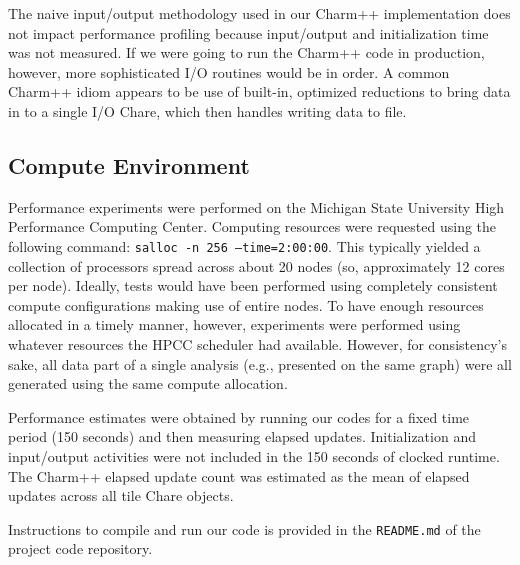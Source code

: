 The naive input/output methodology used in our Charm++ implementation does not impact performance profiling because input/output and initialization time was not measured.
If we were going to run the Charm++ code in production, however, more sophisticated I/O routines would be in order.
A common Charm++ idiom appears to be use of built-in, optimized reductions to bring data in to a single I/O Chare, which then handles writing data to file.

\subsection{Compute Environment} \label{sec:compute}

Performance experiments were performed on the Michigan State University High Performance Computing Center.
Computing resources were requested using the following command: \texttt{salloc -n 256 --time=2:00:00}.
This typically yielded a collection of processors spread across about 20 nodes (so, approximately 12 cores per node).
Ideally, tests would have been performed using completely consistent compute configurations making use of entire nodes.
To have enough resources allocated in a timely manner, however, experiments were performed using whatever resources the HPCC scheduler had available.
However, for consistency's sake, all data part of a single analysis (e.g., presented on the same graph) were all generated using the same compute allocation.

Performance estimates were obtained by running our codes for a fixed time period (150 seconds) and then measuring elapsed updates.
Initialization and input/output activities were not included in the 150 seconds of clocked runtime.
The Charm++ elapsed update count was estimated as the mean of elapsed updates across all tile Chare objects.

Instructions to compile and run our code is provided in the \texttt{README.md} of the project code repository.
